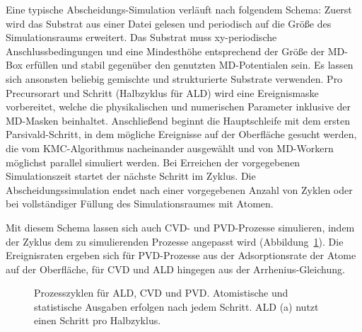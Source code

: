 Eine typische Abscheidungs-Simulation verläuft nach folgendem Schema:
Zuerst wird das Substrat aus einer Datei gelesen und periodisch auf die Größe des Simulationsraums erweitert.
Das Substrat muss xy-periodische Anschlussbedingungen und eine Mindesthöhe entsprechend der Größe der MD-Box erfüllen und stabil gegenüber den genutzten MD-Potentialen sein.
Es lassen sich ansonsten beliebig gemischte und strukturierte Substrate verwenden.
Pro Precursorart und Schritt (Halbzyklus für ALD) wird eine Ereignismaske vorbereitet, welche die physikalischen und numerischen Parameter inklusive der MD-Masken beinhaltet.
Anschließend beginnt die Hauptschleife mit dem ersten Parsivald-Schritt, in dem mögliche Ereignisse auf der Oberfläche gesucht werden, die vom KMC-Algorithmus nacheinander ausgewählt und von MD-Workern möglichst parallel simuliert werden.
Bei Erreichen der vorgegebenen Simulationszeit startet der nächste Schritt im Zyklus.
Die Abscheidungssimulation endet nach einer vorgegebenen Anzahl von Zyklen oder bei vollständiger Füllung des Simulationsraumes mit Atomen.

Mit diesem Schema lassen sich auch CVD- und PVD-Prozesse simulieren, indem der Zyklus dem zu simulierenden Prozesse angepasst wird (Abbildung~\ref{fig:parsivald-modes}).
Die Ereignisraten ergeben sich für PVD-Prozesse aus der Adsorptionsrate der Atome auf der Oberfläche, für CVD und ALD hingegen aus der Arrhenius-Gleichung.

\begin{figure}[hbp]
  \captionsetup[subfigure]{singlelinecheck=false}
  \begin{subfigure}[t]{5.7cm}
    \def\svgwidth{\textwidth}
    
  \end{subfigure}
  \hfill
  \begin{subfigure}[t]{4.7cm}
    \def\svgwidth{\textwidth}
    
  \end{subfigure}
  \hfill
  \begin{subfigure}[t]{3cm}
    \def\svgwidth{\textwidth}
    
  \end{subfigure}
  \caption[Prozesszyklen für ALD, CVD und PVD]{
    Prozesszyklen für ALD, CVD und PVD.
    Atomistische und statistische Ausgaben erfolgen nach jedem Schritt.
    ALD (a) nutzt einen Schritt pro Halbzyklus.
  }
  \label{fig:parsivald-modes}
\end{figure}


